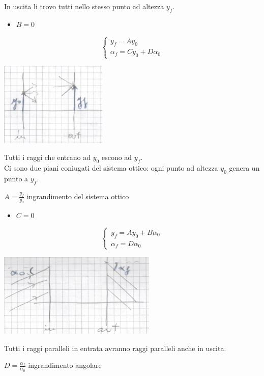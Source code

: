 \documentclass{article}
\theoremstyle{remark}
\begin{document}
In uscita li trovo tutti nello stesso punto ad altezza $y_f$.
\begin{itemize}
\item $B = 0$
\end{itemize}
\begin{minipage}{.5\textwidth}
\[
\begin{cases}
y_f = Ay_0\\
\alpha_f = Cy_0 + D\alpha_0
\end{cases}
\]
\end{minipage}
\begin{minipage}{.5\textwidth}
	\centering
    \includegraphics[height=4cm]{images/b_nullo}
\end{minipage}
Tutti i raggi che entrano ad $y_0$ escono ad $y_f$.\\
Ci sono due piani coniugati del sistema ottico: ogni punto ad altezza $y_0$ genera un punto a $y_f$.\\
\centerline{$A = \frac{y_f}{y_0}$ \qquad ingrandimento del sistema ottico}
\begin{itemize}
\item $C = 0$
\end{itemize}
\begin{minipage}{.5\textwidth}
\[
\begin{cases}
y_f = Ay_0 + B\alpha_0\\
\alpha_f = D\alpha_0
\end{cases}
\]
\end{minipage}
\begin{minipage}{.5\textwidth}
	\centering
    \includegraphics[height=4cm]{images/c_nullo}
\end{minipage}
Tutti i raggi paralleli in entrata avranno raggi paralleli anche in uscita.\\
\centerline{$D = \frac{\alpha_f}{\alpha_0}$	\qquad ingrandimento angolare}
\end{document}
